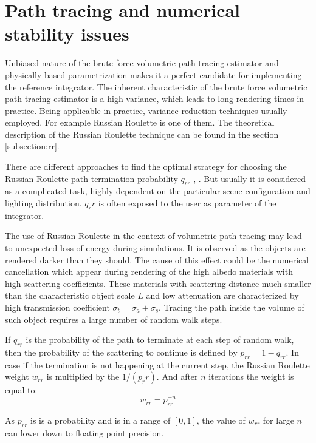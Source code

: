 \section{Path tracing and numerical stability issues}
\label{section:numerical}

Unbiased nature of the brute force volumetric path tracing estimator and physically based
parametrization makes it a perfect candidate for implementing the reference integrator.
The inherent characteristic of the brute force volumetric path tracing estimator is a high variance,
which leads to long rendering times in practice. Being applicable in practice, variance reduction
techniques usually employed. For example Russian Roulette is one of them. The theoretical
description of the Russian Roulette technique can be found in the section \ref{subsection:rr}.

There are different approaches to find the optimal strategy for choosing the Russian Roulette path
termination probability $q_{rr}$ \cite{Veach:1998:RMC:927297}, \cite{And_findinggood}. But usually
it is considered as a complicated task, highly dependent on the particular scene configuration  and
lighting distribution. $q_rr$ is often exposed to the user as parameter of the integrator.

The use of Russian Roulette in the context of volumetric path tracing may lead to unexpected loss of
energy during simulations. It is observed as the objects are rendered darker than they should. The
cause of this effect could be the numerical cancellation which appear during rendering of the high
albedo materials with high scattering coefficients. These materials with scattering distance much
smaller than the characteristic object scale $L$ and low attenuation are characterized by high
transmission coefficient $\sigma_t = \sigma_a + \sigma_s$. Tracing the path inside the volume of
such object requires a large number of random walk steps. 

If $q_{rr}$ is the probability of the path to terminate at each step of random walk, then the
probability of the scattering to continue is defined by $p_{rr} = 1 - q_{rr}$. In case if the
termination is not happening at the current step, the Russian Roulette weight $w_{rr}$ is
multiplied by the $1/(p_rr)$. And after $n$ iterations the weight is equal to:
\begin{equation}
w_{rr} = p_{rr}^{-n}
\end{equation}

As $p_{rr}$ is is a probability and is in a range of $[0,1]$, the value of $w_{rr}$ for large $n$
can lower down to floating point precision.

